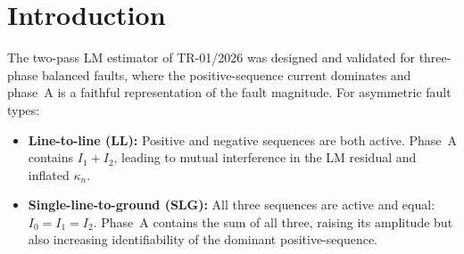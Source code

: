 \documentclass[12pt,a4paper]{article}
\theoremstyle{definition}
\theoremstyle{plain}
\begin{document}
\begin{abstract}
For asymmetric faults (line-to-line, single-line-to-ground), fitting the
SAMBP-SyncOC 6-parameter model to phase~A alone entangles positive-,
negative-, and zero-sequence contributions, degrading the identifiability of
$\hat{I}_{ss}$ and $\hat{\tau}_{ac}$.  This report presents Milestone~3:
a Hilbert--Fortescue sequence-component estimator that decomposes the measured
three-phase currents into instantaneous sequence signals $I_1(t)$, $I_2(t)$,
$I_0(t)$ and fits the two-pass LM estimator independently to each active
sequence.  The positive-sequence parameters govern relay adaptation.
Numerical results on LL and SLG faults confirm: (i) convergence of the
sequence estimator in both cases; (ii) $\gamma = 0.914$ for SLG
(adaptation accepted; pickup reduced from 1.20 to 1.10\,pu), and
$\gamma = 0.587$ for LL (adaptation rejected — confidence below
$\gamma_{\min} = 0.70$).  The SLG result demonstrates the practical value
of the sequence estimator; the LL result reveals a fundamental identifiability
limitation due to negative-sequence contamination of the positive-sequence
Jacobian.  Hilbert edge effects are characterised and shown to be confined
to the first 5--10\,ms of the event window.

\medskip
\noindent\textbf{Keywords:} symmetrical components, Hilbert transform,
Fortescue decomposition, sequence estimation, asymmetric fault,
overcurrent relay, SAMBP-SyncOC.
\end{abstract}

\tableofcontents
\listoffigures
\listoftables
\newpage

\section{Introduction}
\label{sec:intro}

The two-pass LM estimator of TR-01/2026 was designed and validated for
three-phase balanced faults, where the positive-sequence current dominates
and phase~A is a faithful representation of the fault magnitude.  For
asymmetric fault types:
\begin{itemize}
  \item \textbf{Line-to-line (LL):} Positive and negative sequences are
        both active. Phase~A contains $I_1 + I_2$, leading to mutual
        interference in the LM residual and inflated $\kappa_n$.
  \item \textbf{Single-line-to-ground (SLG):} All three sequences are
        active and equal: $I_0 = I_1 = I_2$.  Phase~A contains the
        sum of all three, raising its amplitude but also increasing
        identifiability of the dominant positive-sequence.
\end{itemize}
\end{document}
